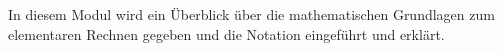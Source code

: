 

\Mtikzexternalize




\begin{MSectionStart}

\MModstartBox

In diesem Modul wird ein Überblick über die mathematischen Grundlagen zum elementaren Rechnen gegeben und die Notation eingeführt und erklärt.
\end{MSectionStart}


